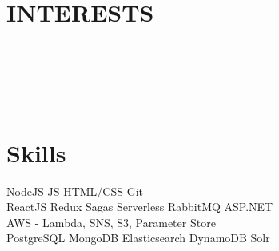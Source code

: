 \documentclass[]{deedy-resume-openfont}
\begin{document}
\begin{minipage}[t]{0.33\textwidth}

\section{INTERESTS} 
\\
\\
\\
\\
\sectionsep

%
%

\end{minipage} 
\hfill
\begin{minipage}[t]{0.66\textwidth} 


\section{Skills}
NodeJS \textbullet{} JS \textbullet{} HTML/CSS \textbullet{} Git \\
ReactJS \textbullet{} Redux \textbullet{} Sagas \textbullet{} Serverless \textbullet{} RabbitMQ \textbullet{} ASP.NET\\
AWS - Lambda, SNS, S3, Parameter Store\\
PostgreSQL \textbullet{} MongoDB \textbullet{} Elasticsearch \textbullet{} DynamoDB \textbullet{} Solr\\
\sectionsep



\end{minipage}
\end{document}
